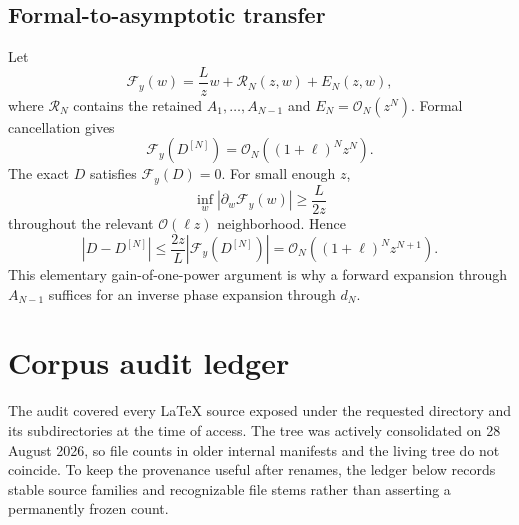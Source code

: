 \documentclass[11pt,oneside]{article}
\numberwithin{equation}{section}
\theoremstyle{definition}
\theoremstyle{remark}
\newcommand{\cO}{\mathcal O}
\begin{document}
\subsection{Formal-to-asymptotic transfer}
Let
\begin{equation}
 \mathscr F_y(w)=\frac Lzw+\mathcal R_N(z,w)+E_N(z,w),
 \label{eq:Fy}
\end{equation}
where $\mathcal R_N$ contains the retained $A_1,\ldots,A_{N-1}$ and
$E_N=\cO_N(z^N)$.  Formal cancellation gives
\begin{equation}
 \mathscr F_y(D^{[N]})=
 \cO_N((1+\ell)^Nz^N).
\end{equation}
The exact $D$ satisfies $\mathscr F_y(D)=0$.  For small enough $z$,
\begin{equation}
 \inf_w|\partial_w\mathscr F_y(w)|\ge\frac{L}{2z}
 \label{eq:implicit-lower-bound}
\end{equation}
throughout the relevant $\cO(\ell z)$ neighborhood.  Hence
\begin{equation}
 |D-D^{[N]}|\le \frac{2z}{L}
 |\mathscr F_y(D^{[N]})|
 =\cO_N((1+\ell)^Nz^{N+1}).
 \label{eq:D-error-transfer}
\end{equation}
This elementary gain-of-one-power argument is why a forward expansion through $A_{N-1}$ suffices for an inverse phase expansion through $d_N$.

\section{Corpus audit ledger}
\label{app:audit}

The audit covered every LaTeX source exposed under the requested directory and its subdirectories at the time of access.  The tree was actively consolidated on 28 August 2026, so file counts in older internal manifests and the living tree do not coincide.  To keep the provenance useful after renames, the ledger below records stable source families and recognizable file stems rather than asserting a permanently frozen count.
\end{document}
